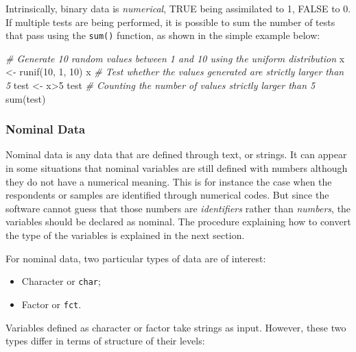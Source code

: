 \documentclass[
]{krantz}
\makeatletter
\newenvironment{Shaded}{\begin{snugshade}}{\end{snugshade}}
\newcommand{\CommentTok}[1]{\textcolor[rgb]{0.37,0.37,0.37}{\textit{#1}}}
\newcommand{\DecValTok}[1]{\textcolor[rgb]{0.06,0.06,0.06}{#1}}
\newcommand{\FunctionTok}[1]{\textcolor[rgb]{0,0,0}{#1}}
\newcommand{\NormalTok}[1]{#1}
\newcommand{\OtherTok}[1]{\textcolor[rgb]{0.37,0.37,0.37}{#1}}
\newcommand{\SpecialCharTok}[1]{\textcolor[rgb]{0,0,0}{#1}}
\providecommand{\tightlist}{%
  \setlength{\itemsep}{0pt}\setlength{\parskip}{0pt}}
\renewenvironment{quote}{\begin{VF}}{\end{VF}}
\newenvironment{kframe}{%
\medskip{}
\setlength{\fboxsep}{.8em}
 \def\at@end@of@kframe{}%
 \ifinner\ifhmode%
  \def\at@end@of@kframe{\end{minipage}}%
  \begin{minipage}{\columnwidth}%
 \fi\fi%
 \def\FrameCommand##1{\hskip\@totalleftmargin \hskip-\fboxsep
 \colorbox{shadecolor}{##1}\hskip-\fboxsep
     \hskip-\linewidth \hskip-\@totalleftmargin \hskip\columnwidth}%
 \MakeFramed {\advance\hsize-\width
   \@totalleftmargin\z@ \linewidth\hsize
   \@setminipage}}%
 {\par\unskip\endMakeFramed%
 \at@end@of@kframe}
\renewenvironment{Shaded}{\begin{kframe}}{\end{kframe}}
\makeatother
\begin{document}
\begin{quote}
Intrinsically, binary data is \emph{numerical}, TRUE being assimilated to 1, FALSE to 0. If multiple tests are being performed, it is possible to sum the number of tests that pass using the \texttt{sum()} function, as shown in the simple example below:
\end{quote}

\begin{Shaded}
\begin{Highlighting}[]
\CommentTok{\# Generate 10 random values between 1 and 10 using the uniform distribution}
\NormalTok{x }\OtherTok{\textless{}{-}} \FunctionTok{runif}\NormalTok{(}\DecValTok{10}\NormalTok{, }\DecValTok{1}\NormalTok{, }\DecValTok{10}\NormalTok{)}
\NormalTok{x}
\CommentTok{\# Test whether the values generated are strictly larger than 5}
\NormalTok{test }\OtherTok{\textless{}{-}}\NormalTok{ x}\SpecialCharTok{\textgreater{}}\DecValTok{5}
\NormalTok{test}
\CommentTok{\# Counting the number of values strictly larger than 5}
\FunctionTok{sum}\NormalTok{(test)}
\end{Highlighting}
\end{Shaded}

\hypertarget{nominal-data}{%
\subsubsection{Nominal Data}\label{nominal-data}}

Nominal data is any data that are defined through text, or strings. It can appear in some situations that nominal variables are still defined with numbers although they do not have a numerical meaning. This is for instance the case when the respondents or samples are identified through numerical codes. But since the software cannot guess that those numbers are \emph{identifiers} rather than \emph{numbers}, the variables should be declared as nominal. The procedure explaining how to convert the type of the variables is explained in the next section.

For nominal data, two particular types of data are of interest:

\begin{itemize}
\tightlist
\item
  Character or \texttt{char};
\item
  Factor or \texttt{fct}.
\end{itemize}

Variables defined as character or factor take strings as input. However, these two types differ in terms of structure of their levels:
\end{document}
